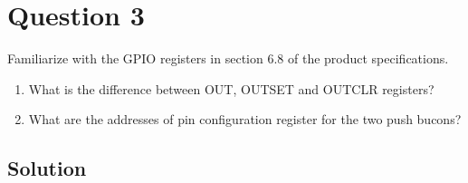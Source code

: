 \section*{Question 3}

Familiarize with the GPIO registers in section 6.8 of the product specifications.
\begin{enumerate}[label= (\alph*)]
    \item What is the diﬀerence between OUT, OUTSET and OUTCLR registers?
    \item What are the addresses of pin configuration register for the two push bucons?
\end{enumerate}

\subsection*{Solution}
